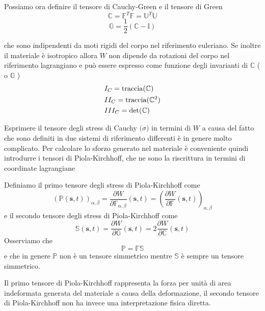 Possiamo ora definire il tensore di Cauchy-Green e il tensore di Green
\begin{equation*}
\mathbb{C} = \mathbb{F}^T\mathbb{F} = \mathbb{U}^T\mathbb{U}
\end{equation*}
\begin{equation*}
\mathbb{G} = \frac{1}{2}(\mathbb{C}-\mathbb{I})
\end{equation*}

che sono indipendenti da moti rigidi del corpo nel riferimento euleriano. Se inoltre il materiale è isotropico allora $W$ non dipende da rotazioni del corpo nel riferimento lagrangiano e può essere espresso come funzione degli invarianti di $\mathbb{C}$ ( o $\mathbb{G}$ )
\begin{align*}
&I_C = \operatorname{traccia}(\mathbb{C}) \\
&II_C = \operatorname{traccia}(\mathbb{C}^2) \\
&III_C = \det(\mathbb{C}) \\
\end{align*}

Esprimere il tensore degli stress di Cauchy $\boldsymbol(\sigma)$ in termini di $W$ a causa del fatto che sono definiti in due sistemi di riferimento differenti è in genere molto complicato.
Per calcolare lo sforzo generato nel materiale è conveniente quindi introdurre i tensori di Piola-Kirchhoff, che ne sono la riscrittura in termini di coordinate lagrangiane

Definiamo il primo tensore degli stress di Piola-Kirchhoff come
\begin{equation*}
(\mathbb{P}(\mathbf{s},t))_{\alpha,\beta} = \frac{\partial W}{\partial \mathbb{F}_{\alpha,\beta}} (\mathbf{s},t) =\left( \frac{\partial W}{\partial \mathbb{F}} (\mathbf{s},t)\right)_{\alpha,\beta}
\end{equation*}
e il secondo tensore degli stress di Piola-Kirchhoff come
\begin{equation*}
\mathbb{S}(\mathbf{s},t)=\frac{\partial W}{\partial\mathbb{G}}(\mathbf{s},t)=2\frac{\partial W}{\partial\mathbb{C}}(\mathbf{s},t)
\end{equation*}
Osserviamo che
\begin{equation*}
\mathbb{P}=\mathbb{F}\mathbb{S}
\end{equation*}
e che in genere $\mathbb{P}$ non è un tensore simmetrico mentre $\mathbb{S}$ è sempre un tensore simmetrico.

Il primo tensore di Piola-Kirchhoff rappresenta la forza per unità di area indeformata generata del materiale a causa della deformazione, il secondo tensore di Piola-Kirchhoff non ha invece una interpretazione fisica diretta.

